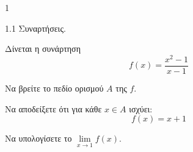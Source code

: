 \begin{ylh}{1}
    \item 1.1 Συναρτήσεις.
\end{ylh}
Δίνεται η συνάρτηση
\[ f(x) = \frac{x^2 - 1}{x - 1} \]
\begin{alist}
    \item Να βρείτε το πεδίο ορισμού $A$ της $f$. 
    \item Να αποδείξετε ότι για κάθε $x \in A$ ισχύει:
    \[ f(x) = x + 1 \] 
    \item Να υπολογίσετε το $\lim\limits_{x \to 1} f(x)$. 
\end{alist}

